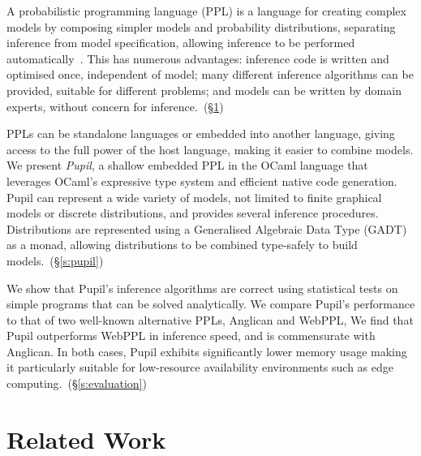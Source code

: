 \documentclass[sigconf]{acmart}
\newcommand{\s}[1]{(\S\ref{#1})}
\newcommand{\pupil}{Pupil\xspace}
\begin{document}
A probabilistic programming language (PPL) is a language for creating complex models by composing simpler models and probability distributions, separating inference from model specification, allowing inference to be performed automatically~\cite{gordon2014probabilistic}. This has numerous advantages: inference code is written and optimised once, independent of model; many different inference algorithms can be provided, suitable for different problems; and models can be written by domain experts, without concern for inference.~\s{s:related}

PPLs can be standalone languages or embedded into another language, giving access to the full power of the host language, making it easier to combine models. We present \emph{\pupil}, a shallow embedded PPL in the OCaml language that leverages OCaml's expressive type system and efficient native code generation. \pupil can represent a wide variety of models, not limited to finite graphical models or discrete distributions, and provides several inference procedures. Distributions are represented using a Generalised Algebraic Data Type (GADT) as a monad, allowing distributions to be combined type-safely to build models.~\s{s:pupil}

We show that \pupil's inference algorithms are correct using statistical tests on simple programs that can be solved analytically. We compare \pupil's performance to that of two well-known alternative PPLs, Anglican and WebPPL, We find that \pupil outperforms WebPPL in inference speed, and is commensurate with Anglican. In both cases, \pupil exhibits significantly lower memory usage making it particularly suitable for low-resource availability environments such as edge computing.~\s{s:evaluation}

\section{Related Work}
\label{s:related}
\end{document}
